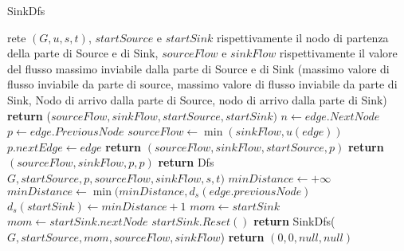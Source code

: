 \documentclass{article}
\begin{document}
\begin{algorithm}
\caption{SinkDfs}
\begin{algorithmic}
\REQUIRE rete $(G,u,s,t)$, $startSource$ e $startSink$ rispettivamente il nodo di partenza della parte di Source e di Sink, $sourceFlow$ e $sinkFlow$ rispettivamente il valore del flusso massimo inviabile dalla parte di Source e di Sink
\ENSURE (massimo valore di flusso inviabile da parte di source, massimo valore di flusso inviabile da parte di Sink, Nodo di arrivo dalla parte di Source, nodo di arrivo dalla parte di Sink)
\STATE \textbf{return} ($sourceFlow,sinkFlow,startSource,startSink)$ 
\ENDIF
{}
\STATE $n \leftarrow edge.NextNode$
\STATE $p \leftarrow edge.PreviousNode$
\STATE $sourceFlow \leftarrow \min(sinkFlow, u(edge))$
\STATE $ p.nextEdge \leftarrow edge$ 
\STATE \textbf{return} $(sourceFlow,sinkFlow,startSource,p)$
\ENDIF
{}
\STATE \textbf{return}  $(sourceFlow, sinkFlow,p,p)$
\ENDIF
\STATE \textbf{return} Dfs$G,startSource, p, sourceFlow, sinkFlow,s,t)$
\ENDIF
\ENDFOR
\STATE $minDistance \leftarrow +\infty$
\STATE $minDistance \leftarrow \min(minDistance, d_s(edge.previousNode)$
\ENDIF
\ENDFOR
\STATE $d_s(startSink) \leftarrow minDistance+1$
\STATE $mom \leftarrow startSink$
\ELSE
\STATE $mom \leftarrow startSink.nextNode$ 
\ENDIF
\STATE $startSink.Reset()$
\STATE \textbf{return} SinkDfs($G,startSource, mom, sourceFlow, sinkFlow$)
\ENDIF 
\STATE \textbf{return} $(0,0,null,null)$

\end{algorithmic}
\end{algorithm}
\end{document}
